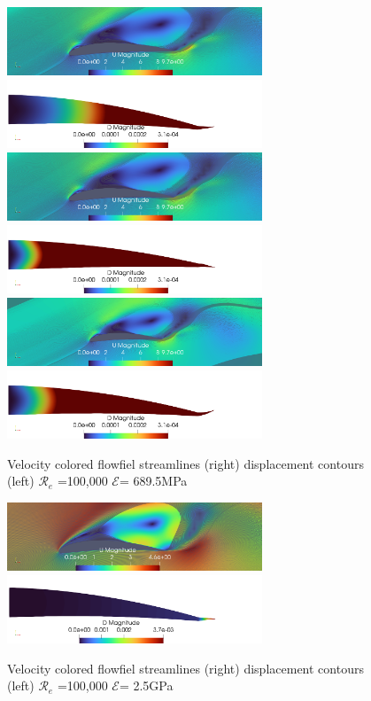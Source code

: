 \begin{figure}[hbt!]
    \includegraphics[width=3in]{Figures/streamLines0988Coupling.png}
    \includegraphics[width=3in]{Figures/DMAgnitude0988Coupling.png}
    \includegraphics[width=3in]{Figures/streamLines0992Coupling.png}
    \includegraphics[width=3in]{Figures/DMAgnitude0992Coupling.png}
    \includegraphics[width=3in]{Figures/streamLines0998Coupling.png}
    \includegraphics[width=3in]{Figures/DMAgnitude0998Coupling.png}
  \caption{\label{fig:velocity&Displacement} Velocity colored flowfiel streamlines (right) displacement contours (left) $\mathcal{R}_e$ =100,000 $\mathcal{E}$= 689.5MPa}
\end{figure}

\begin{figure}[hbt!]
  \centering
    \includegraphics[width=3in]{Figures/streamLines25GPACoupling.png}
    \includegraphics[width=3in]{Figures/DMAgnitude25GPaCoupling.png}
  \caption{\label{fig:25GPA} Velocity colored flowfiel streamlines (right) displacement contours (left) $\mathcal{R}_e$ =100,000 $\mathcal{E}$= 2.5GPa}
\end{figure}

